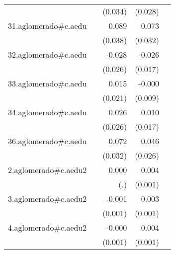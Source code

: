 {\begin{longtable}{l*{4}{D{.}{.}{-1}}}
            &                     &     (0.034)         &     (0.028)         &                     \\
\addlinespace
31.aglomerado#c.aedu&                     &       0.089\sym{*}  &       0.073\sym{*}  &                     \\
            &                     &     (0.038)         &     (0.032)         &                     \\
\addlinespace
32.aglomerado#c.aedu&                     &      -0.028         &      -0.026         &                     \\
            &                     &     (0.026)         &     (0.017)         &                     \\
\addlinespace
33.aglomerado#c.aedu&                     &       0.015         &      -0.000         &                     \\
            &                     &     (0.021)         &     (0.009)         &                     \\
\addlinespace
34.aglomerado#c.aedu&                     &       0.026         &       0.010         &                     \\
            &                     &     (0.026)         &     (0.017)         &                     \\
\addlinespace
36.aglomerado#c.aedu&                     &       0.072\sym{*}  &       0.046         &                     \\
            &                     &     (0.032)         &     (0.026)         &                     \\
\addlinespace
2.aglomerado#c.aedu2&                     &       0.000         &       0.004\sym{***}&                     \\
            &                     &         (.)         &     (0.001)         &                     \\
\addlinespace
3.aglomerado#c.aedu2&                     &      -0.001         &       0.003\sym{**} &                     \\
            &                     &     (0.001)         &     (0.001)         &                     \\
\addlinespace
4.aglomerado#c.aedu2&                     &      -0.000         &       0.004\sym{***}&                     \\
            &                     &     (0.001)         &     (0.001)         &                     \\

\end{longtable}}

